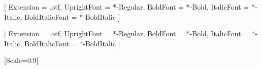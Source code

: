 
\usepackage{fontspec}
\usepackage{unicode-math}

\setmainfont{Minion Pro}[
    Extension = .otf,
    UprightFont = *-Regular,
    BoldFont = *-Bold,
    ItalicFont = *-Italic,
    BoldItalicFont = *-BoldItalic
]

\setsansfont{Myriad Pro}[
    Extension = .otf,
    UprightFont = *-Regular,
    BoldFont = *-Bold,
    ItalicFont = *-Italic,
    BoldItalicFont = *-BoldItalic
]

\setmonofont{Latin Modern Mono}[Scale=0.9]


\usepackage[
    paperwidth=7in,
    paperheight=10in,
    textwidth=5in,
    textheight=7.5in,
    top=1.25in,
    bottom=1.25in,
    inner=1in,
    outer=1in,
    headsep=0.25in,
    footskip=0.35in
]{geometry}

\usepackage[a-1b,pdf17]{pdfx}
\usepackage{xcolor}

\newif\ifprintversion
\printversionfalse  %

\ifprintversion
    \definecolor{boxblue}{RGB}{100,100,100}
    \definecolor{boxgreen}{RGB}{120,120,120}
    \definecolor{boxyellow}{RGB}{140,140,140}
    \definecolor{boxred}{RGB}{80,80,80}
\else
\fi

\usepackage{graphicx}
\usepackage{tikz}
\usetikzlibrary{shapes,arrows,positioning,calc,patterns,decorations.pathreplacing,decorations.markings}
\usepackage{pdfpages}

